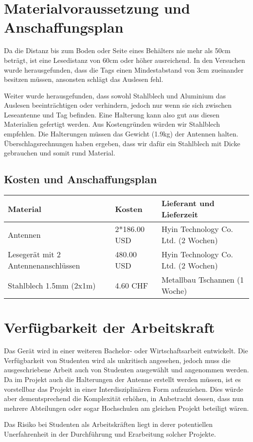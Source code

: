 \chapter{Materialvoraussetzung und Anschaffungsplan}
\label{sec:Materialvoraussetzung_Anschaffungsplan}
Da die Distanz bis zum Boden oder Seite eines Behälters nie mehr als 50cm beträgt, ist eine Lesedistanz von 60cm oder höher ausreichend. In den Versuchen wurde herausgefunden, dass die Tags einen Mindestabstand von 3cm zueinander besitzen müssen, ansonsten schlägt das Auslesen fehl.

Weiter wurde herausgefunden, dass sowohl Stahlblech und Aluminium das Auslesen beeinträchtigen oder verhindern, jedoch nur wenn sie sich zwischen Leseantenne und Tag befinden. Eine Halterung kann also gut aus diesen Materialien gefertigt werden. Aus Kostengründen würden wir Stahlblech empfehlen. Die Halterungen müssen das Gewicht (1.9kg) der Antennen halten. Überschlagsrechnungen haben ergeben, dass wir dafür ein Stahlblech mit Dicke gebrauchen und somit rund Material.

\section{Kosten und Anschaffungsplan}
\begin{table}[h!]
	\centering
	\begin{tabularx}{\textwidth}{|X|X|X|}
		\hline
		\textbf{Material} & \textbf{Kosten} & \textbf{Lieferant und Lieferzeit} \\
		\hline
		Antennen & 2*186.00 USD & Hyin Technology Co. Ltd. (2 Wochen)\\
		\hline
		Lesegerät mit 2 Antennenanschlüssen & 480.00 USD & Hyin Technology Co. Ltd. (2 Wochen)\\
		\hline
		Stahlblech 1.5mm (2x1m) & 4.60 CHF & Metallbau Tschannen (1 Woche)\\
		\hline
	\end{tabularx}
\end{table}

\chapter{Verfügbarkeit der Arbeitskraft}
Das Gerät wird in einer weiteren Bachelor- oder Wirtschaftsarbeit entwickelt. Die Verfügbarkeit von Studenten wird als unkritisch angesehen, jedoch muss die ausgeschriebene Arbeit auch von Studenten ausgewählt und angenommen werden. Da im Projekt auch die Halterungen der Antenne erstellt werden müssen, ist es vorstellbar das Projekt in einer Interdisziplinären Form aufzuziehen. Dies würde aber dementsprechend die Komplexität erhöhen, in Anbetracht dessen, dass nun mehrere Abteilungen oder sogar Hochschulen am gleichen Projekt beteiligt wären.

Das Risiko bei Studenten als Arbeitskräften liegt in derer potentiellen Unerfahrenheit in der Durchführung und Erarbeitung solcher Projekte.
